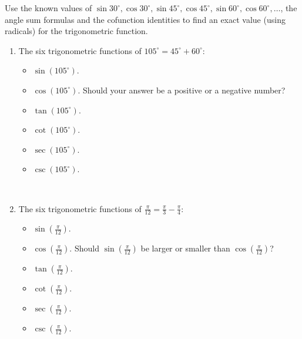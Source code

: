 Use the known values of $\sin 30^\circ, \cos 30^\circ,  \sin 45^\circ, \cos 45^\circ, \sin 60^\circ, \cos 60^\circ, \dots$, the angle sum formulas and the cofunction identities to find an exact value (using radicals) for the trigonometric function.

\begin{multicols}{2}
\begin{enumerate}[ref={\fcProblemRef}]
\item  The six trigonometric functions of $105^\circ = 45^\circ +60^\circ$:
\begin{itemize}
\item $\sin \left(105^\circ\right)$.

\item $\cos \left(105^\circ\right)$. Should your answer be a positive or a negative number?

\item $\tan \left(105^\circ\right)$. 

\item $\cot \left(105^\circ\right)$. 

\item $\sec \left(105^\circ\right)$. 

\item $\csc \left(105^\circ\right)$. 

\end{itemize}
~\\

\item The six trigonometric functions of $\frac{\pi}{12}=\frac{\pi}{3}- \frac{\pi}{4}$:
\begin{itemize}
\item $\sin \left(\frac{\pi}{12}\right)$.

\item $\cos \left(\frac{\pi}{12}\right)$. Should $\sin \left(\frac{\pi}{12} \right)$ be larger or smaller than $\cos \left(\frac{\pi}{12}\right)$?

\item $\tan \left(\frac{\pi}{12}\right)$. 

\item $\cot \left(\frac{\pi}{12}\right)$. 

\item $\sec \left(\frac{\pi}{12}\right)$. 

\item $\csc \left(\frac{\pi}{12}\right)$. 

\end{itemize}
\end{enumerate}
\end{multicols}